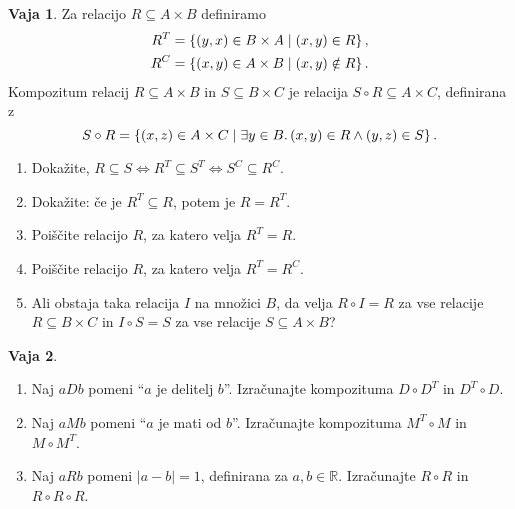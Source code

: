 \documentclass{article}
\newcommand{\some}[1]{\exists #1 .\,}
\newcommand{\RR}{\mathbb{R}}
\theoremstyle{definition}
\newtheorem{vaja}{Vaja}
\begin{document}
\begin{vaja}
Za relacijo $R \subseteq A \times B$ definiramo
%
\begin{align*}
  R^T &= \set{(y,x) \in B \times A}{(x,y) \in R},\\
  R^C &= \set{(x,y) \in A \times B}{(x,y) \notin R}.
\end{align*}
%
Kompozitum relacij $R \subseteq A \times B$ in $S \subseteq B \times
C$ je relacija $S \circ R \subseteq A \times C$, definirana z
%
\begin{equation*}
  S \circ R = \set{(x,z) \in A \times C}{\some{y \in B}{(x,y) \in R \land (y,z) \in S}}.
\end{equation*}
\begin{enumerate}
  \item Dokažite, $R \subseteq S \iff R^T \subseteq
  S^T \iff S^C \subseteq R^C$.

  \item Dokažite: če je $R^T \subseteq R$, potem je $R = R^T$.

  \item Poiščite relacijo $R$, za katero velja $R^T = R$.

  \item Poiščite relacijo $R$, za katero velja $R^T = R^C$.


  \item Ali obstaja taka relacija $I$ na množici $B$, da velja $R
  \circ I = R$ za vse relacije $R \subseteq B \times C$ in $I \circ S
  = S$ za vse relacije $S \subseteq A \times B$?
\end{enumerate}
\end{vaja}

\begin{vaja}
\
\begin{enumerate}
  \item Naj $a D b$ pomeni "`$a$ je delitelj $b$"'. Izračunajte kompozituma $D \circ D^T$ in $D^T \circ D$.

  \item Naj $a M b$ pomeni "`$a$ je mati od $b$"'. Izračunajte kompozituma $M^T \circ M$ in $M \circ M^T$.

  \item Naj $a R b$ pomeni $|a - b| = 1$, definirana za $a, b \in \RR$. Izračunajte $R \circ R$ in $R \circ R \circ R$.
\end{enumerate}
\end{vaja}

\pagebreak
\end{document}
